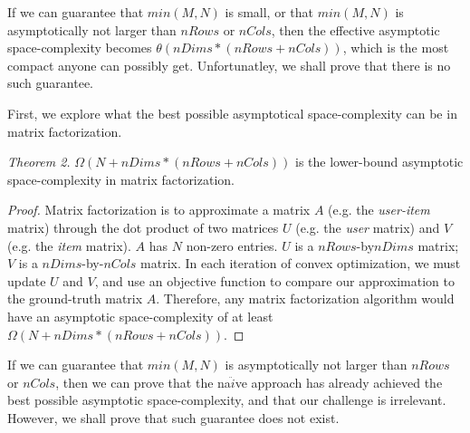 If we can guarantee that $min(M,N)$ is small, or that $min(M,N)$ is asymptotically not larger than $nRows$ or $nCols$, 
then the effective asymptotic space-complexity becomes $\theta(nDims*(nRows+nCols))$, which is the most compact anyone can possibly get.  Unfortunatley, we shall prove that there is no such guarantee.  

First, we explore what the best possible asymptotical space-complexity can be in matrix factorization.

\emph{Theorem 2.}
$\Omega(N+nDims*(nRows+nCols))$ is the lower-bound asymptotic space-complexity in matrix factorization.
\begin{proof}  
Matrix factorization is to approximate a matrix $A$ (e.g. the \emph{user-item} matrix) through the dot product of two matrices $U$ (e.g. the \emph{user} matrix) and $V$ (e.g. the \emph{item} matrix). 
$A$ has $N$ non-zero entries.  $U$ is a $nRows$-by$nDims$ matrix; $V$ is a $nDims$-by-$nCols$ matrix.  
In each iteration of convex optimization, we must update $U$ and $V$, and use an objective function to compare our approximation to the ground-truth matrix $A$.  
Therefore, any matrix factorization algorithm would have an asymptotic space-complexity of at least $\Omega(N+nDims*(nRows+nCols))$.
\end{proof}

If we can guarantee that $min(M,N)$ is asymptotically not larger than $nRows$ or $nCols$, 
then we can prove that the na$\ddot{i}$ve approach has already achieved the best possible asymptotic space-complexity, and that our challenge is irrelevant.
However, we shall prove that such guarantee does not exist.

